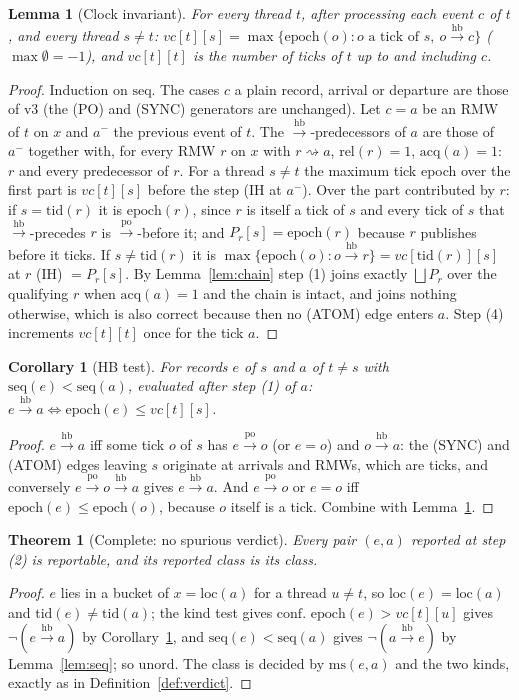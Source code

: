 \documentclass[11pt]{article}
\newtheorem{lemma}{Lemma}
\newtheorem{theorem}{Theorem}
\newtheorem{corollary}{Corollary}
\theoremstyle{remark}
\newcommand{\PO}{\xrightarrow{\mathrm{po}}}
\newcommand{\HB}{\xrightarrow{\mathrm{hb}}}
\newcommand{\tid}{\mathrm{tid}}
\newcommand{\loc}{\mathrm{loc}}
\newcommand{\rel}{\mathrm{rel}}
\newcommand{\acq}{\mathrm{acq}}
\newcommand{\ms}{\mathrm{ms}}
\newcommand{\conf}{\mathrm{conf}}
\newcommand{\unord}{\mathrm{unord}}
\newcommand{\seq}{\mathrm{seq}}
\newcommand{\epoch}{\mathrm{epoch}}
\newcommand{\vc}{\mathit{vc}}
\newcommand{\chain}{\rightsquigarrow}
\newcommand{\Pub}{P}
\begin{document}
\begin{lemma}[Clock invariant]\label{lem:clock}
For every thread $t$, after processing each event $c$ of $t$, and every thread
$s\ne t$: $\vc[t][s]=\max\{\epoch(o): o\text{ a tick of }s,\ o\HB c\}$
($\max\emptyset=-1$), and $\vc[t][t]$ is the number of ticks of $t$ up to and
including $c$.
\end{lemma}
\begin{proof}
Induction on $\seq$. The cases $c$ a plain record, arrival or departure are
those of v3 (the (PO) and (SYNC) generators are unchanged). Let $c=a$ be an
RMW of $t$ on $x$ and $a^-$ the previous event of $t$. The $\HB$-predecessors
of $a$ are those of $a^-$ together with, for every RMW $r$ on $x$ with
$r\chain a$, $\rel(r)=1$, $\acq(a)=1$: $r$ and every predecessor of $r$. For a
thread $s\ne t$ the maximum tick epoch over the first part is
$\vc[t][s]$ before the step (IH at $a^-$). Over the part contributed by $r$:
if $s=\tid(r)$ it is $\epoch(r)$, since $r$ is itself a tick of $s$ and every
tick of $s$ that $\HB$-precedes $r$ is $\PO$-before it; and
$\Pub_r[s]=\epoch(r)$ because $r$ publishes before it ticks. If $s\ne\tid(r)$
it is $\max\{\epoch(o):o\HB r\}=\vc[\tid(r)][s]$ at $r$ (IH) $=\Pub_r[s]$.
By Lemma~\ref{lem:chain} step (1) joins exactly $\bigsqcup\Pub_r$ over the
qualifying $r$ when $\acq(a)=1$ and the chain is intact, and joins nothing
otherwise, which is also correct because then no (ATOM) edge enters $a$.
Step (4) increments $\vc[t][t]$ once for the tick $a$.
\end{proof}

\begin{corollary}[HB test]\label{cor:test}
For records $e$ of $s$ and $a$ of $t\ne s$ with $\seq(e)<\seq(a)$, evaluated
after step (1) of $a$: $e\HB a\iff\epoch(e)\le\vc[t][s]$.
\end{corollary}
\begin{proof}
$e\HB a$ iff some tick $o$ of $s$ has $e\PO o$ (or $e=o$) and $o\HB a$: the
(SYNC) and (ATOM) edges leaving $s$ originate at arrivals and RMWs, which are
ticks, and conversely $e\PO o\HB a$ gives $e\HB a$. And $e\PO o$ or $e=o$ iff
$\epoch(e)\le\epoch(o)$, because $o$ itself is a tick. Combine with
Lemma~\ref{lem:clock}.
\end{proof}

\begin{theorem}[Complete: no spurious verdict]\label{thm:complete}
Every pair $(e,a)$ reported at step (2) is reportable, and its reported class
is its class.
\end{theorem}
\begin{proof}
$e$ lies in a bucket of $x=\loc(a)$ for a thread $u\ne t$, so $\loc(e)=\loc(a)$
and $\tid(e)\ne\tid(a)$; the kind test gives $\conf$. $\epoch(e)>\vc[t][u]$
gives $\neg(e\HB a)$ by Corollary~\ref{cor:test}, and $\seq(e)<\seq(a)$ gives
$\neg(a\HB e)$ by Lemma~\ref{lem:seq}; so $\unord$. The class is decided by
$\ms(e,a)$ and the two kinds, exactly as in Definition~\ref{def:verdict}.
\end{proof}
\end{document}

